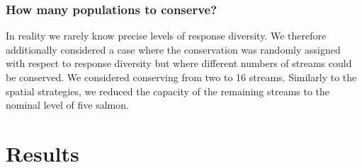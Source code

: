 \subsubsection{How many populations to conserve?}

In reality we rarely know precise levels of response diversity. We
therefore additionally considered a case where the conservation was
randomly assigned with respect to response diversity but where different
numbers of streams could be conserved. We considered conserving from two
to 16 streams. Similarly to the spatial strategies, we reduced the
capacity of the remaining streams to the nominal level of five salmon.

\section{Results}

